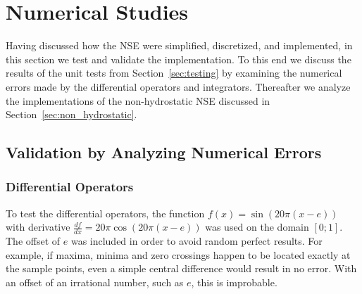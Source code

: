 \chapter{Numerical Studies}\label{chapter:numerical_study}
Having discussed how the NSE were simplified, discretized, and implemented, in this section we test and validate the implementation.
To this end we discuss the results of the unit tests from Section~\ref{sec:testing} by examining the numerical errors made by the differential operators and integrators.
Thereafter we analyze the implementations of the non-hydrostatic NSE discussed in Section~\ref{sec:non_hydrostatic}.

\section{Validation by Analyzing Numerical Errors}

\subsection{Differential Operators}\label{sec:numeric_diff_ops}
To test the differential operators, the function $f(x)=\sin(20\pi (x-e))$ with derivative $\frac{df}{dx}=20\pi\cos(20\pi (x-e))$ was used on the domain $[0;1]$.
The offset of $e$ was included in order to avoid random perfect results.
For example, if maxima, minima and zero crossings happen to be located exactly at the sample points, even a simple central difference would result in no error.
With an offset of an irrational number, such as $e$, this is improbable.

